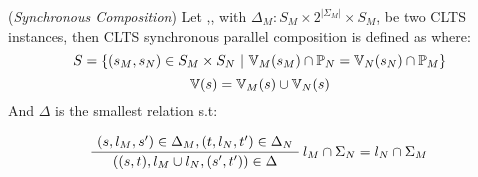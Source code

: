
\begin{definition} 
	\label{def:synchronous_composition}(\emph{Synchronous Composition}) Let ,, with $\Delta_M : S_M \times 2^{|\Sigma_M|} \times S_M$, be two CLTS instances, then CLTS synchronous parallel composition is defined as  where:\\
	 \[S = \{(s_M,s_N) \in S_M \times S_N~|~ {\mathbb{V}}_M(s_M) \cap {\mathbb{P}}_N = {\mathbb{V}}_N(s_N) \cap {\mathbb{P}}_M  \}\]
	 \[ {\mathbb{V}}(s) = {\mathbb{V}}_M(s) \cup {\mathbb{V}}_N(s)\] 
	 And $\Delta$ is the smallest relation s.t:
	\begin{center}
		\begin{equation}
		\AxiomC{$(s, l_M, s') \in \Delta_M,(t, l_N, t') \in \Delta_N  $}\RightLabel{$l_M \cap \Sigma_N = l_N \cap \Sigma_M$}
		\UnaryInfC{$((s,t),l_M \cup l_N,(s',t')) \in \Delta$}
		\DisplayProof	
		\end{equation}	
	\end{center}
\end{definition}